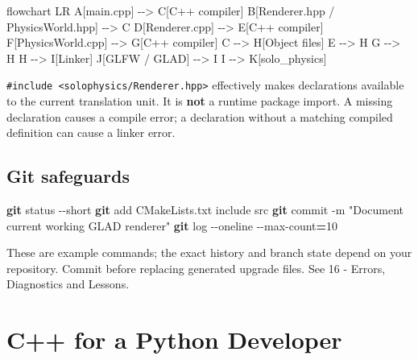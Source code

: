\documentclass[
  10pt,
  a4paper,
]{article}
\newenvironment{Shaded}{\begin{snugshade}}{\end{snugshade}}
\newcommand{\AttributeTok}[1]{\textcolor[rgb]{0.13,0.29,0.53}{#1}}
\newcommand{\FunctionTok}[1]{\textcolor[rgb]{0.13,0.29,0.53}{\textbf{#1}}}
\newcommand{\NormalTok}[1]{#1}
\newcommand{\OperatorTok}[1]{\textcolor[rgb]{0.81,0.36,0.00}{\textbf{#1}}}
\newcommand{\StringTok}[1]{\textcolor[rgb]{0.31,0.60,0.02}{#1}}
\begin{document}
\begin{Shaded}
\begin{Highlighting}[]
\NormalTok{flowchart LR}
\NormalTok{ A[main.cpp] {-}{-}\textgreater{} C[C++ compiler]}
\NormalTok{ B[Renderer.hpp / PhysicsWorld.hpp] {-}{-}\textgreater{} C}
\NormalTok{ D[Renderer.cpp] {-}{-}\textgreater{} E[C++ compiler]}
\NormalTok{ F[PhysicsWorld.cpp] {-}{-}\textgreater{} G[C++ compiler]}
\NormalTok{ C {-}{-}\textgreater{} H[Object files]}
\NormalTok{ E {-}{-}\textgreater{} H}
\NormalTok{ G {-}{-}\textgreater{} H}
\NormalTok{ H {-}{-}\textgreater{} I[Linker]}
\NormalTok{ J[GLFW / GLAD] {-}{-}\textgreater{} I}
\NormalTok{ I {-}{-}\textgreater{} K[solo\_physics]}
\end{Highlighting}
\end{Shaded}

\texttt{\#include\ \textless{}solophysics/Renderer.hpp\textgreater{}}
effectively makes declarations available to the current translation
unit. It is \textbf{not} a runtime package import. A missing declaration
causes a compile error; a declaration without a matching compiled
definition can cause a linker error.

\subsection{Git safeguards}\label{git-safeguards}

\begin{Shaded}
\begin{Highlighting}[]
\FunctionTok{git}\NormalTok{ status }\AttributeTok{{-}{-}short}
\FunctionTok{git}\NormalTok{ add CMakeLists.txt include src}
\FunctionTok{git}\NormalTok{ commit }\AttributeTok{{-}m} \StringTok{"Document current working GLAD renderer"}
\FunctionTok{git}\NormalTok{ log }\AttributeTok{{-}{-}oneline} \AttributeTok{{-}{-}max{-}count}\OperatorTok{=}\NormalTok{10}
\end{Highlighting}
\end{Shaded}

These are example commands; the exact history and branch state depend on
your repository. Commit before replacing generated upgrade files. See 16
- Errors, Diagnostics and Lessons.

\newpage

\section{C++ for a Python Developer}\label{c-for-a-python-developer}
\end{document}
